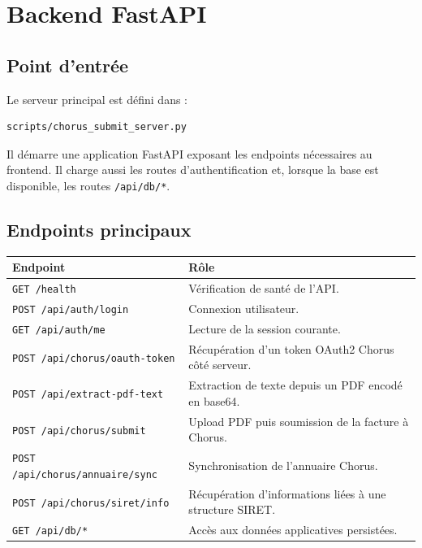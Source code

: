\documentclass[11pt,a4paper]{article}
\begin{document}
\section{Backend FastAPI}

\subsection{Point d'entrée}

Le serveur principal est défini dans :

\begin{lstlisting}
scripts/chorus_submit_server.py
\end{lstlisting}

Il démarre une application FastAPI exposant les endpoints nécessaires au
frontend. Il charge aussi les routes d'authentification et, lorsque la base est
disponible, les routes \texttt{/api/db/*}.

\subsection{Endpoints principaux}

\begin{longtable}{|p{}|p{}|}
  \hline
  \textbf{Endpoint} & \textbf{Rôle} \\
  \hline
  \texttt{GET /health} &
  Vérification de santé de l'API. \\
  \hline
  \texttt{POST /api/auth/login} &
  Connexion utilisateur. \\
  \hline
  \texttt{GET /api/auth/me} &
  Lecture de la session courante. \\
  \hline
  \texttt{POST /api/chorus/oauth-token} &
  Récupération d'un token OAuth2 Chorus côté serveur. \\
  \hline
  \texttt{POST /api/extract-pdf-text} &
  Extraction de texte depuis un PDF encodé en base64. \\
  \hline
  \texttt{POST /api/chorus/submit} &
  Upload PDF puis soumission de la facture à Chorus. \\
  \hline
  \texttt{POST /api/chorus/annuaire/sync} &
  Synchronisation de l'annuaire Chorus. \\
  \hline
  \texttt{POST /api/chorus/siret/info} &
  Récupération d'informations liées à une structure SIRET. \\
  \hline
  \texttt{GET /api/db/*} &
  Accès aux données applicatives persistées. \\
  \hline
\end{longtable}
\end{document}

